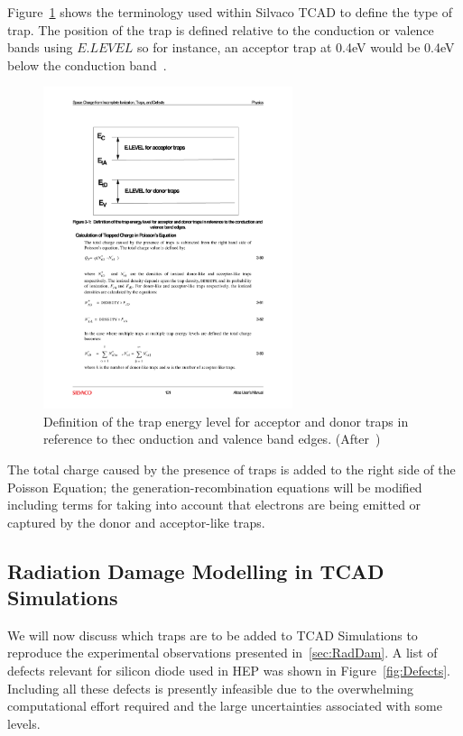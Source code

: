 Figure~\ref{fig:TCAD_Defects} shows the terminology used within Silvaco TCAD to define the type of trap. The position of the trap is defined relative to the conduction or valence bands using $E.LEVEL$ so for instance, an acceptor trap at 0.4eV would be 0.4eV below the conduction band~\cite{SilvacoAtlas}.

\begin{figure}
\centering
\includegraphics[width=0.65\textwidth]{TCAD_traps.pdf}
\caption{\label{fig:TCAD_Defects}Definition of the trap energy level for acceptor and donor traps in reference to thec onduction and valence band edges. (After~\cite{SilvacoAtlas})}
\end{figure}

The total charge caused by the presence of traps is added to the right side of the Poisson Equation; 
the generation-recombination equations will be modified including terms for taking into account 
that electrons are being emitted or captured by the donor and acceptor-like traps.



\subsection{Radiation Damage Modelling in TCAD Simulations}
\label{sec:TCADRadDamModels}

We will now discuss which traps are to be added to TCAD Simulations to reproduce the 
experimental observations presented in~\ref{sec:RadDam}.
A list of defects relevant for silicon diode used in HEP was shown 
in Figure~\ref{fig:Defects}.  Including all these defects is presently infeasible  due to the overwhelming computational effort required and the large uncertainties associated with some levels. 

